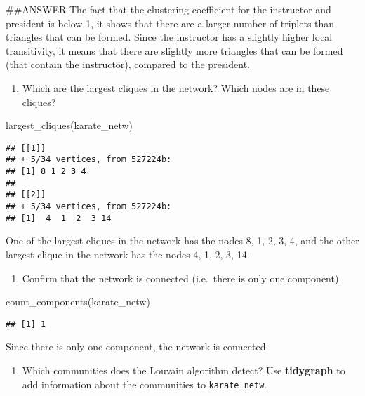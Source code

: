 \documentclass[
]{article}
\newenvironment{Shaded}{\begin{snugshade}}{\end{snugshade}}
\newcommand{\FunctionTok}[1]{\textcolor[rgb]{0.00,0.00,0.00}{#1}}
\newcommand{\NormalTok}[1]{#1}
\providecommand{\tightlist}{%
  \setlength{\itemsep}{0pt}\setlength{\parskip}{0pt}}
\begin{document}
\#\#ANSWER The fact that the clustering coefficient for the instructor
and president is below 1, it shows that there are a larger number of
triplets than triangles that can be formed. Since the instructor has a
slightly higher local transitivity, it means that there are slightly
more triangles that can be formed (that contain the instructor),
compared to the president.

\begin{enumerate}
\def\labelenumi{(\arabic{enumi})}
\setcounter{enumi}{7}
\tightlist
\item
  Which are the largest cliques in the network? Which nodes are in these
  cliques?
\end{enumerate}

\begin{Shaded}
\begin{Highlighting}[]
\FunctionTok{largest\_cliques}\NormalTok{(karate\_netw)}
\end{Highlighting}
\end{Shaded}

\begin{verbatim}
## [[1]]
## + 5/34 vertices, from 527224b:
## [1] 8 1 2 3 4
## 
## [[2]]
## + 5/34 vertices, from 527224b:
## [1]  4  1  2  3 14
\end{verbatim}

\Ans One of the largest cliques in the network has the nodes 8, 1, 2, 3,
4, and the other largest clique in the network has the nodes 4, 1, 2, 3,
14.

\begin{enumerate}
\def\labelenumi{(\arabic{enumi})}
\setcounter{enumi}{8}
\tightlist
\item
  Confirm that the network is connected (i.e.~there is only one
  component).
\end{enumerate}

\begin{Shaded}
\begin{Highlighting}[]
\FunctionTok{count\_components}\NormalTok{(karate\_netw)}
\end{Highlighting}
\end{Shaded}

\begin{verbatim}
## [1] 1
\end{verbatim}

\Ans Since there is only one component, the network is connected.

\begin{enumerate}
\def\labelenumi{(\arabic{enumi})}
\setcounter{enumi}{9}
\tightlist
\item
  Which communities does the Louvain algorithm detect? Use
  \textbf{tidygraph} to add information about the communities to
  \texttt{karate\_netw}.
\end{enumerate}
\end{document}
